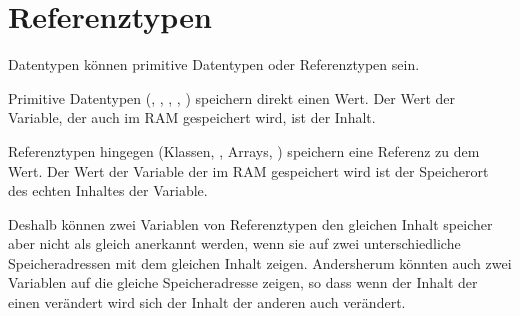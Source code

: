 \documentclass{article}
\begin{document}
\section{Referenztypen} 
Datentypen können primitive Datentypen oder Referenztypen sein.

Primitive Datentypen (, , , , \etc) speichern direkt einen Wert. Der Wert der Variable, der auch im RAM gespeichert wird, ist der Inhalt.

Referenztypen hingegen (Klassen, \zb {}, Arrays, \etc) speichern eine Referenz zu dem Wert. Der Wert der Variable der im RAM gespeichert wird ist der Speicherort des echten Inhaltes der Variable.

Deshalb können zwei Variablen von Referenztypen den gleichen Inhalt speicher aber nicht als gleich anerkannt werden, wenn sie auf zwei unterschiedliche Speicheradressen mit dem gleichen Inhalt zeigen. Andersherum könnten auch zwei Variablen auf die gleiche Speicheradresse zeigen, so dass wenn der Inhalt der einen verändert wird sich der Inhalt der anderen auch verändert.
\end{document}
